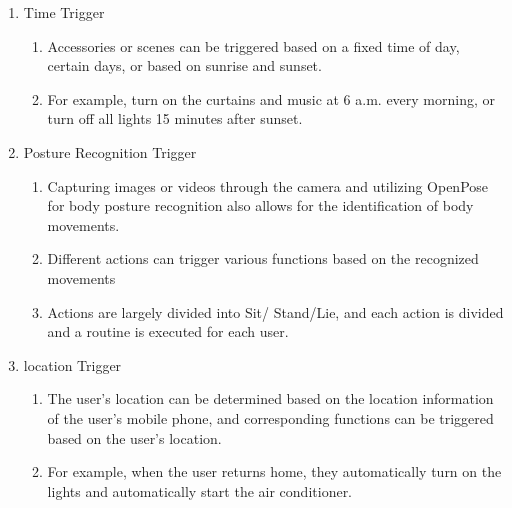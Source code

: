 \begin{enumerate}[label=\arabic*.]
\begin{enumerate}[label*={\arabic*.}]
\begin{enumerate}[label*={\alph*.},ref=\theenumi.\arabic*]
                              \item {\large{Time Trigger}}\\
                                    \begin{enumerate}[label*={\arabic*.},ref=\theenumi.\arabic*]
                                          \setlength{\itemindent}{0.5cm}
                                          \item Accessories or scenes can be triggered based on a fixed time of day, certain days, or based on sunrise and sunset. \\
                                          \item For example, turn on the curtains and music at 6 a.m. every morning, or turn off all lights 15 minutes after sunset.\\
                                    \end{enumerate}

                              \item {\large{Posture Recognition Trigger}}\\
                                    \begin{enumerate}[label*={\arabic*.},ref=\theenumi.\arabic*]
                                          \setlength{\itemindent}{0.5cm}
                                          \item Capturing images or videos through the camera and utilizing OpenPose for body posture recognition also allows for the identification of body movements.\\
                                          \item Different actions can trigger various functions based on the recognized movements
                                          \item Actions are largely divided into Sit/ Stand/Lie, and each action is divided and a routine is executed for each user.\\
                                    \end{enumerate}

                              \item {\large{location Trigger}}\\
                                    \begin{enumerate}[label*={\arabic*.},ref=\theenumi.\arabic*]
                                          \setlength{\itemindent}{0.5cm}
                                          \item The user's location can be determined based on the location information of the user's mobile phone, and corresponding functions can be triggered based on the user's location.\\
                                          \item For example, when the user returns home, they automatically turn on the lights and automatically start the air conditioner.\\


\end{enumerate}
\end{enumerate}
\end{enumerate}
\end{enumerate}

